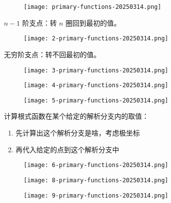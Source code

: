 \begin{figure}[H]
\centering
\texttt{[image: primary-functions-20250314.png]}
\label{}
\end{figure}

$n-1$ 阶支点：转 $n$ 圈回到最初的值。

\begin{figure}[H]
\centering
\texttt{[image: 2-primary-functions-20250314.png]}
\label{}
\end{figure}

无穷阶支点：转不回最初的值。

\begin{figure}[H]
\centering
\texttt{[image: 3-primary-functions-20250314.png]}
\label{}
\end{figure}

\begin{figure}[H]
\centering
\texttt{[image: 4-primary-functions-20250314.png]}
\label{}
\end{figure}

\begin{figure}[H]
\centering
\texttt{[image: 5-primary-functions-20250314.png]}
\label{}
\end{figure}

计算根式函数在某个给定的解析分支内的取值：

\begin{enumerate}
	\item 先计算出这个解析分支是啥，考虑极坐标
	\item 再代入给定的点到这个解析分支中
\end{enumerate}

\begin{figure}[H]
\centering
\texttt{[image: 6-primary-functions-20250314.png]}
\label{}
\end{figure}

\begin{figure}[H]
\centering
\texttt{[image: 8-primary-functions-20250314.png]}
\label{}
\end{figure}

\begin{figure}[H]
\centering
\texttt{[image: 9-primary-functions-20250314.png]}
\label{}
\end{figure}
